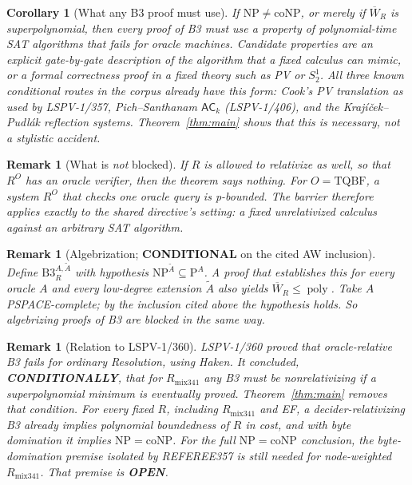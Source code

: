 \documentclass[11pt]{article}
\newtheorem{corollary}[theorem]{Corollary}
\newtheorem{remark}[theorem]{Remark}
\newcommand{\W}{\overline W}
\begin{document}
\begin{corollary}[What any B3 proof must use]\label{cor:use}
If $\mathrm{NP}\neq\mathrm{coNP}$, or merely if $\W_R$ is superpolynomial, then every proof of B3 must use a property of
polynomial-time SAT algorithms that \emph{fails for oracle machines}. Candidate properties are
an explicit gate-by-gate description of the algorithm that a fixed calculus can mimic,
or a formal correctness proof in a fixed theory such as PV or $S^1_2$.
All three known conditional routes in the corpus already have this form: Cook's PV translation as used by LSPV-1/357,
Pich--Santhanam $\mathsf{AC}_k$ (LSPV-1/406), and the Krajíček--Pudlák reflection systems.
Theorem~\ref{thm:main} shows that this is necessary, not a stylistic accident.
\end{corollary}

\begin{remark}[What is \emph{not} blocked]
If $R$ is allowed to relativize as well, so that $R^O$ has an oracle verifier, then the theorem says nothing.
For $O=\mathrm{TQBF}$, a system $R^O$ that checks one oracle query is p-bounded. The barrier therefore
applies exactly to the shared directive's setting: a \emph{fixed} unrelativized calculus against an
\emph{arbitrary} SAT algorithm.
\end{remark}

\begin{remark}[Algebrization; \textbf{CONDITIONAL} on the cited AW inclusion]\label{rem:alg}
Define $\mathrm{B3}^{A,\tilde A}_R$ with hypothesis $\mathrm{NP}^{\tilde A}\subseteq\mathrm P^{A}$. A proof that establishes
this for every oracle $A$ and every low-degree extension $\tilde A$ also yields $\W_R\le\operatorname{poly}$.
Take $A$ PSPACE-complete; by the inclusion cited above the hypothesis holds.
So algebrizing proofs of B3 are blocked in the same way.
\end{remark}

\begin{remark}[Relation to LSPV-1/360]
LSPV-1/360 proved that oracle-relative B3 \emph{fails} for ordinary Resolution, using Haken.
It concluded, \textbf{CONDITIONALLY}, that for $R_{\mathrm{mix341}}$ any B3 must be nonrelativizing
\emph{if} a superpolynomial minimum is eventually proved. Theorem~\ref{thm:main} removes that condition.
For every fixed $R$, including $R_{\mathrm{mix341}}$ and EF, a decider-relativizing B3 already implies
polynomial boundedness of $R$ in cost, and with byte domination it implies $\mathrm{NP}=\mathrm{coNP}$.
For the full $\mathrm{NP}=\mathrm{coNP}$ conclusion, the byte-domination premise isolated by REFEREE357 is
still needed for node-weighted $R_{\mathrm{mix341}}$.
That premise is \textbf{OPEN}.
\end{remark}
\end{document}
